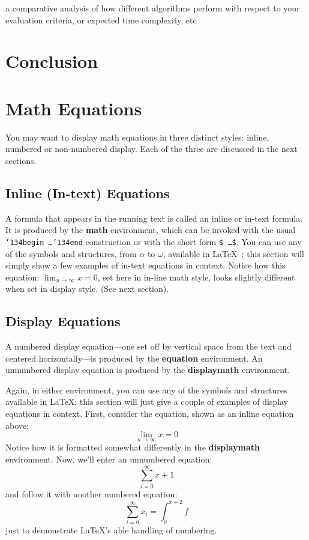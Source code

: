 \documentclass[acmlarge]{acmart}
\begin{document}
a comparative analysis of how different algorithms perform with respect to your evaluation
criteria, or expected time complexity, etc


\section{Conclusion}



\section{Math Equations}
You may want to display math equations in three distinct styles:
inline, numbered or non-numbered display.  Each of the three are
discussed in the next sections.

\subsection{Inline (In-text) Equations}
A formula that appears in the running text is called an inline or
in-text formula.  It is produced by the \textbf{math} environment,
which can be invoked with the usual
\texttt{{\char'134}begin\,\ldots{\char'134}end} construction or with
the short form \texttt{\$\,\ldots\$}. You can use any of the symbols
and structures, from $\alpha$ to $\omega$, available in
\LaTeX~\cite{Lamport:LaTeX}; this section will simply show a few
examples of in-text equations in context. Notice how this equation:
\begin{math}
  \lim_{n\rightarrow \infty}x=0
\end{math},
set here in in-line math style, looks slightly different when
set in display style.  (See next section).

\subsection{Display Equations}
A numbered display equation---one set off by vertical space from the
text and centered horizontally---is produced by the \textbf{equation}
environment. An unnumbered display equation is produced by the
\textbf{displaymath} environment.

Again, in either environment, you can use any of the symbols and
structures available in \LaTeX\@; this section will just give a couple
of examples of display equations in context.  First, consider the
equation, shown as an inline equation above:
\begin{equation}
  \lim_{n\rightarrow \infty}x=0
\end{equation}
Notice how it is formatted somewhat differently in
the \textbf{displaymath}
environment.  Now, we'll enter an unnumbered equation:
\begin{displaymath}
  \sum_{i=0}^{\infty} x + 1
\end{displaymath}
and follow it with another numbered equation:
\begin{equation}
  \sum_{i=0}^{\infty}x_i=\int_{0}^{\pi+2} f
\end{equation}
just to demonstrate \LaTeX's able handling of numbering.
\end{document}
